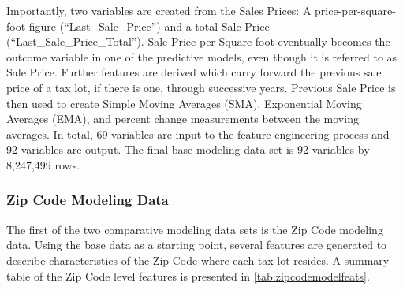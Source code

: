 \documentclass[12pt,]{article}
\begin{document}
Importantly, two variables are created from the Sales Prices: A
price-per-square-foot figure (``Last\_Sale\_Price'') and a total Sale
Price (``Last\_Sale\_Price\_Total''). Sale Price per Square foot
eventually becomes the outcome variable in one of the predictive models,
even though it is referred to as Sale Price. Further features are
derived which carry forward the previous sale price of a tax lot, if
there is one, through successive years. Previous Sale Price is then used
to create Simple Moving Averages (SMA), Exponential Moving Averages
(EMA), and percent change measurements between the moving averages. In
total, 69 variables are input to the feature engineering process and 92
variables are output. The final base modeling data set is 92 variables
by 8,247,499 rows.

\hypertarget{zip-code-modeling-data}{%
\subsubsection{Zip Code Modeling Data}\label{zip-code-modeling-data}}

The first of the two comparative modeling data sets is the Zip Code
modeling data. Using the base data as a starting point, several features
are generated to describe characteristics of the Zip Code where each tax
lot resides. A summary table of the Zip Code level features is presented
in \ref{tab:zipcodemodelfeats}.
\end{document}

